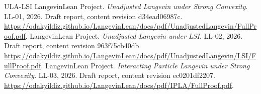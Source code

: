 \documentclass[11pt,a4paper]{report}
\begin{document}
\begin{thebibliography}{ULA-LSI}
LangevinLean Project. \emph{Unadjusted Langevin under Strong Convexity}. LL-01, 2026. Draft report, content revision d34ead06987c. \url{https://odakyildiz.github.io/LangevinLean/docs/pdf/UnadjustedLangevin/FullProof.pdf}.
LangevinLean Project. \emph{Unadjusted Langevin under LSI}. LL-02, 2026. Draft report, content revision 963f75cb40db. \url{https://odakyildiz.github.io/LangevinLean/docs/pdf/UnadjustedLangevin/LSI/FullProof.pdf}.
LangevinLean Project. \emph{Interacting Particle Langevin under Strong Convexity}. LL-03, 2026. Draft report, content revision ec0201df2207. \url{https://odakyildiz.github.io/LangevinLean/docs/pdf/IPLA/FullProof.pdf}.
\end{thebibliography}
\end{document}
